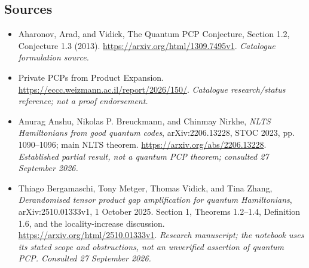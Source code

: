 \documentclass[11pt,a4paper]{article}
\numberwithin{equation}{section}
\begin{document}
\subsection{Sources}
\begin{itemize}\raggedright
\item[\textnormal{[S1]}]\hypertarget{source:30006691:1}{} Aharonov, Arad, and Vidick, The Quantum PCP Conjecture, Section 1.2, Conjecture 1.3 (2013).
\url{https://arxiv.org/html/1309.7495v1}.
{\small\textit{Catalogue formulation source.}}
\item[\textnormal{[S2]}]\hypertarget{source:30006691:2}{} Private PCPs from Product Expansion.
\url{https://eccc.weizmann.ac.il/report/2026/150/}.
{\small\textit{Catalogue research/status reference; not a proof endorsement.}}
\item[\textnormal{[E1]}]\hypertarget{extra:30006691:1}{} Anurag Anshu, Nikolas P. Breuckmann,
and Chinmay Nirkhe, \emph{NLTS Hamiltonians from good quantum codes},
arXiv:2206.13228, STOC 2023, pp. 1090--1096; main NLTS theorem.
\url{https://arxiv.org/abs/2206.13228}.
{\small\textit{Established partial result, not a quantum PCP theorem;
consulted 27 September 2026.}}
\item[\textnormal{[E2]}]\hypertarget{extra:30006691:2}{} Thiago Bergamaschi, Tony Metger,
Thomas Vidick, and Tina Zhang, \emph{Derandomised tensor product gap
amplification for quantum Hamiltonians}, arXiv:2510.01333v1,
1 October 2025. Section 1, Theorems 1.2--1.4, Definition 1.6,
and the locality-increase discussion.
\url{https://arxiv.org/html/2510.01333v1}.
{\small\textit{Research manuscript; the notebook uses its stated scope and
obstructions, not an unverified assertion of quantum PCP.
Consulted 27 September 2026.}}
\end{itemize}
\end{document}
